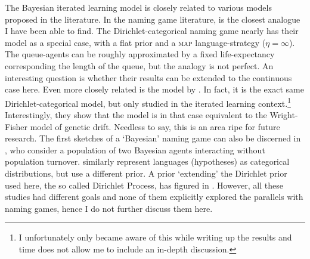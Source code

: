 \documentclass{../src/bcthesispart}
\begin{document}
The Bayesian iterated learning model is closely related to various models proposed in the literature.
In the naming game literature, \textcite{DeVylder2006} is the closest analogue I have been able to find.
The Dirichlet-categorical naming game nearly has their model as a special case, with a flat prior and a \textsc{map} language-strategy ($\eta=\infty$).
The queue-agents can be roughly approximated by a fixed life-expectancy corresponding the length of the queue, but the analogy is not perfect.
An interesting question is whether their results can be extended to the continuous case here.
Even more closely related is the model by \textcite{Reali2010}.
In fact, it is the exact same Dirichlet-categorical model, but only studied in the iterated learning context.\footnote{%
	I unfortunately only became aware of this while writing up the results and time does not allow me to include an in-depth discussion.
	}
Interestingly, they show that the model is in that case equivalent to the Wright-Fisher model of genetic drift.
Needless to say, this is an area ripe for future research.
The first sketches of a ‘Bayesian’ naming game can also be discerned in \textcite{Kirby2015}, who consider a population of two Bayesian agents interacting without population turnover.
\textcite{Ferdinand2009} similarly represent languages (hypotheses) as categorical distributions, but use a different prior.
A prior ‘extending’ the Dirichlet prior used here, the so called Dirichlet Process, has figured in \textcite{Burkett2010,Kirby2015}.
However, all these studies had different goals and none of them explicitly explored the parallels with naming games, hence I do not further discuss them here.


\showbibliography
\end{document}
